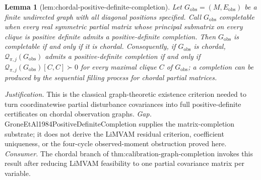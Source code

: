 \documentclass{article}
\newtheorem{lemma}{Lemma}
\begin{document}
\begin{lemma}[lem:chordal-positive-definite-completion]\label{lem:chordal-positive-definite-completion}
Let \(G_{\mathrm{obs}}=(M,E_{\mathrm{obs}})\) be a finite undirected graph with all diagonal positions specified.  Call \(G_{\mathrm{obs}}\) completable when every real symmetric partial matrix whose principal submatrix on every clique is positive definite admits a positive-definite completion.  Then \(G_{\mathrm{obs}}\) is completable if and only if it is chordal.  Consequently, if \(G_{\mathrm{obs}}\) is chordal, \(\mathcal Q_{\pi,j}(G_{\mathrm{obs}})\) admits a positive-definite completion if and only if \(\mathcal Q_{\pi,j}(G_{\mathrm{obs}})[C,C]\succ0\) for every maximal clique \(C\) of \(G_{\mathrm{obs}}\); a completion can be produced by the sequential filling process for chordal partial matrices.
\end{lemma}
\par\smallskip\noindent \textit{Justification.} This is the classical graph-theoretic existence criterion needed to turn coordinatewise partial disturbance covariances into full positive-definite certificates on chordal observation graphs. \textit{Gap.} GroneEtAl1984PositiveDefiniteCompletion supplies the matrix-completion substrate; it does not derive the LiMVAM residual criterion, coefficient uniqueness, or the four-cycle observed-moment obstruction proved here. \textit{Consumer.} The chordal branch of \(\text{thm:calibration-graph-completion}\) invokes this result after reducing LiMVAM feasibility to one partial covariance matrix per variable.
\end{document}
